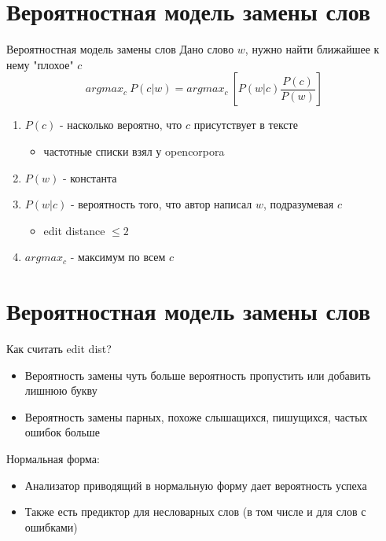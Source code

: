 \documentclass{beamer}
\begin{document}
\section{Вероятностная модель замены слов}
\begin{frame}[t]{Вероятностная модель замены слов}
    Дано слово $w$, нужно найти ближайшее к нему "плохое" $c$
    $$argmax_c ~ {P(c|w)} = argmax_c ~ \left[ {P(w|c) \frac{P(c)}{P(w)}} \right]$$
    \begin{enumerate}
        \item $P(c)$ - насколько вероятно, что $c$ присутствует в тексте
            \begin{itemize}
                \item частотные списки взял у opencorpora
            \end{itemize}
        \item $P(w)$ - константа
        \item $P(w|c)$ - вероятность того, что автор написал $w$, подразумевая $c$
            \begin{itemize}
                \item edit distance $\leqslant 2$
            \end{itemize}
        \item $argmax_c$ - максимум по всем $c$
    \end{enumerate}
\end{frame}

\section{Вероятностная модель замены слов}
\begin{frame}
    Как считать edit dist?
    \begin{itemize}
        \item Вероятность замены чуть больше вероятность пропустить или добавить лишнюю букву
        \item Вероятность замены парных, похоже слышащихся, пишущихся, частых ошибок больше
    \end{itemize}
    Нормальная форма:
    \begin{itemize}
        \item Анализатор приводящий в нормальную форму дает вероятность успеха
        \item Также есть предиктор для несловарных слов (в том числе и для слов с ошибками)
    \end{itemize}
\end{frame}
\end{document}
